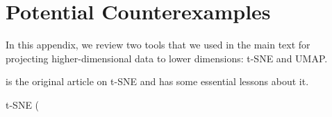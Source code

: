 
\section{Potential Counterexamples}

In this appendix, we review two tools that we used in the main text for projecting higher-dimensional data to lower dimensions: t-SNE and UMAP. 

\cite{JMLR:v9:vandermaaten08a} is the original article on t-SNE and \cite{wattenberg2016how} has some essential lessons about it.

t-SNE (